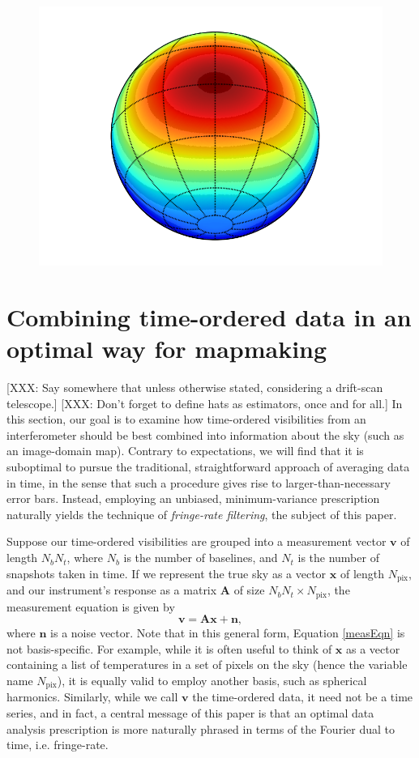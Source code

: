 \documentclass[twocolumn,apj,numberedappendix]{emulateapj}
\newcommand{\vis}{\mathbf{v}}
\newcommand{\x}{\mathbf{x}}
\newcommand{\A}{\mathbf{A}}
\begin{document}
\begin{figure}
\includegraphics[width=.9\columnwidth]{plots/fringe_contours.png}
\caption{
}\label{fig:fringe_contours}
\end{figure}


\section{Combining time-ordered data in an optimal way for mapmaking}

[XXX: Say somewhere that unless otherwise stated, considering a drift-scan telescope.]
[XXX: Don't forget to define hats as estimators, once and for all.]
In this section, our goal is to examine how time-ordered visibilities from an
interferometer should be best combined into information about the sky (such as
an image-domain map).  Contrary to expectations, we will find that it is
suboptimal to pursue the traditional, straightforward approach of averaging
data in time, in the sense that such a procedure gives rise to
larger-than-necessary error bars.  Instead, employing an unbiased,
minimum-variance prescription naturally yields the technique of
\emph{fringe-rate filtering}, the subject of this paper.

Suppose our time-ordered visibilities are grouped into a measurement vector
$\vis$ of length $N_b N_t$, where $N_b$ is the number of baselines, and $N_t$
is the number of snapshots taken in time.  If we represent the true sky as a
vector $\x$ of length $N_\textrm{pix}$, and our instrument's response as a
matrix $\A$ of size $N_b N_t \times N_\textrm{pix}$, the measurement equation
is given by
\begin{equation}
\label{measEqn}
\vis = \A \x + \mathbf{n},
\end{equation}
where $\mathbf{n}$ is a noise vector.  Note that in this general form, Equation
\eqref{measEqn} is not basis-specific.  For example, while it is often useful
to think of $\x$ as a vector containing a list of temperatures in a set of
pixels on the sky (hence the variable name $N_\textrm{pix}$), it is equally
valid to employ another basis, such as spherical harmonics.  Similarly, while
we call $\vis$ the time-ordered data, it need not be a time series, and in
fact, a central message of this paper is that an optimal data analysis
prescription is more naturally phrased in terms of the Fourier dual to time,
i.e. fringe-rate.
\end{document}
